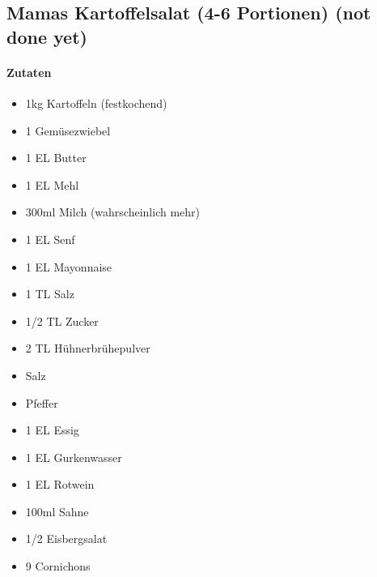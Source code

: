 \newpage
\subsection{Mamas Kartoffelsalat (4-6 Portionen) (not done yet)}
\paragraph{Zutaten}
\begin{itemize}[noitemsep]
	\item 1kg Kartoffeln (festkochend)
	\item 1 Gemüsezwiebel
	\item 1 EL Butter
	\item 1 EL Mehl
	\item 300ml Milch (wahrscheinlich mehr)
	\item 1 EL Senf
	\item 1 EL Mayonnaise
	\item 1 TL Salz
	\item 1/2 TL Zucker
	\item 2 TL Hühnerbrühepulver
	\item Salz
	\item Pfeffer
	\item 1 EL Essig
	\item 1 EL Gurkenwasser
	\item 1 EL Rotwein
	\item 100ml Sahne
	\item 1/2 Eisbergsalat
	\item 9 Cornichons
\end{itemize}
